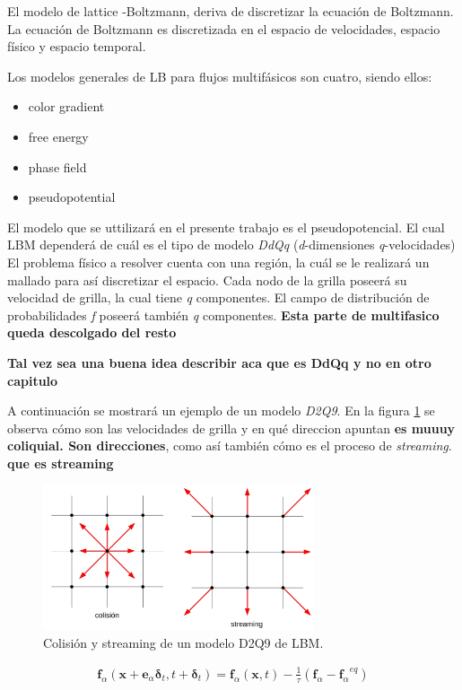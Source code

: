 El modelo de lattice -Boltzmann, deriva de discretizar la ecuación de Boltzmann. La ecuación de Boltzmann es discretizada en el espacio de velocidades, espacio físico y espacio temporal.

Los modelos generales de LB para flujos multifásicos son cuatro, siendo ellos:

\begin{itemize}
	\item color gradient
	\item free energy
	\item phase field
	\item pseudopotential
\end{itemize}

El modelo que se uttilizará en el presente trabajo es el pseudopotencial. El cual  LBM dependerá de cuál es el tipo de modelo \textit{DdQq} (\textit{d}-dimensiones  \textit{q}-velocidades)
El problema físico a resolver cuenta con una región, la cuál se le realizará un mallado para así discretizar el espacio. Cada nodo de la grilla poseerá su velocidad de grilla, la cual tiene \textit{q} componentes. El campo de distribución de probabilidades \textit{f} poseerá también \textit{q} componentes. \textbf{Esta parte de multifasico queda descolgado del resto}

\textbf{Tal vez sea una buena idea describir aca que es DdQq y no en otro capitulo}

A continuación se mostrará un ejemplo de un modelo \textit{D2Q9}. En la figura \ref{fig:grilla_D2Q9} se observa cómo son las velocidades de grilla y en qué direccion apuntan \textbf{es muuuy coliquial. Son direcciones}, como así también cómo es el proceso de \textit{streaming}. \textbf{que es streaming}

\begin{figure}[h!]
	\centering
	\includegraphics[width=8cm]{grilla_stre_colli_intro.png}
	\caption{Colisión y streaming de un modelo D2Q9 de LBM.}
	\label{fig:grilla_D2Q9}
\end{figure}


\begin{align}
	\mathbf{f}_{\alpha} (\mathbf{x} + \mathbf{e}_{\alpha} \mathbf{\delta}_{t}, t + \mathbf{\delta}_{t})  = \mathbf{f}_{\alpha} (\mathbf{x}, t) - \frac{1}{\tau} (\mathbf{f}_{\alpha} - {\mathbf{f}_{\alpha}}^{eq})
	\label{eq:field_intro} 
\end{align}

